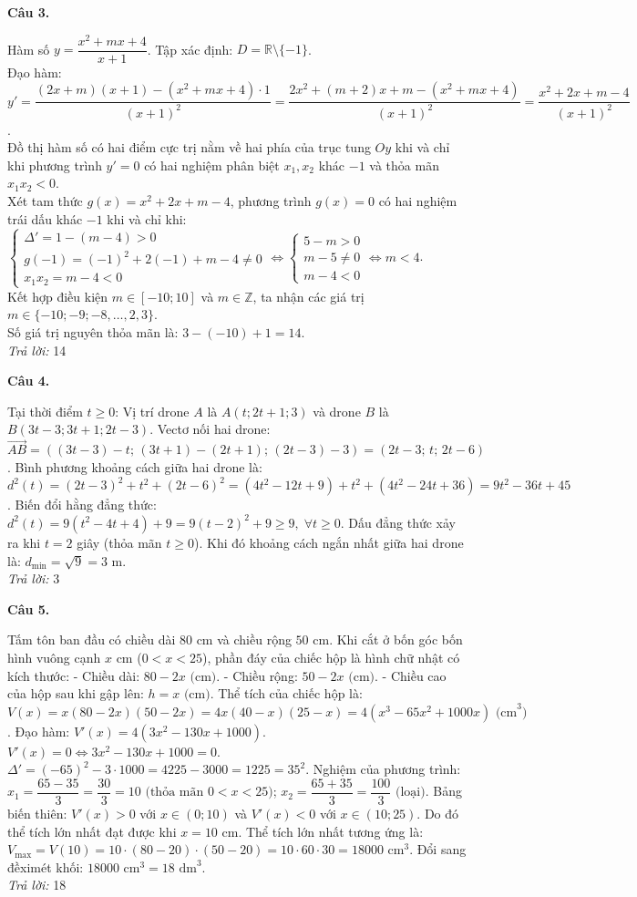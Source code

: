 \documentclass[12pt,a4paper]{article}
\newcommand{\loigiai}[1]{\par\medskip\Needspace{4\baselineskip}\noindent\textbf{#1}\par\nobreak}
\begin{document}
\loigiai{Câu 3.}
Hàm số $y=\dfrac{x^2+mx+4}{x+1}$. Tập xác định: $D=\mathbb{R}\setminus\{-1\}$.\\
Đạo hàm:
$y'=\dfrac{(2x+m)(x+1)-(x^2+mx+4)\cdot 1}{(x+1)^2}=\dfrac{2x^2+(m+2)x+m-(x^2+mx+4)}{(x+1)^2}=\dfrac{x^2+2x+m-4}{(x+1)^2}$.\\
Đồ thị hàm số có hai điểm cực trị nằm về hai phía của trục tung $Oy$ khi và chỉ khi phương trình $y'=0$ có hai nghiệm phân biệt $x_1, x_2$ khác $-1$ và thỏa mãn $x_1 x_2 < 0$.\\
Xét tam thức $g(x)=x^2+2x+m-4$, phương trình $g(x)=0$ có hai nghiệm trái dấu khác $-1$ khi và chỉ khi:
$\begin{cases}\Delta'=1-(m-4)>0\\g(-1)=(-1)^2+2(-1)+m-4\ne 0\\x_1 x_2 = m-4 < 0\end{cases}
\iff \begin{cases}5-m>0\\m-5\ne 0\\m-4<0\end{cases}\iff m<4$.\\
Kết hợp điều kiện $m\in[-10;10]$ và $m\in\mathbb{Z}$, ta nhận các giá trị $m\in\{-10;-9;-8,\dots,2,3\}$.\\
Số giá trị nguyên thỏa mãn là: $3-(-10)+1=14$.\\
\textit{Trả lời:} 14

\loigiai{Câu 4.}
Tại thời điểm $t\ge 0$:
Vị trí drone $A$ là $A(t;2t+1;3)$ và drone $B$ là $B(3t-3;3t+1;2t-3)$.
Vectơ nối hai drone:
$\vec{AB} = ((3t-3)-t;\,(3t+1)-(2t+1);\,(2t-3)-3) = (2t-3;\,t;\,2t-6)$.
Bình phương khoảng cách giữa hai drone là:
$d^2(t) = (2t-3)^2 + t^2 + (2t-6)^2 = (4t^2-12t+9) + t^2 + (4t^2-24t+36) = 9t^2-36t+45$.
Biến đổi hằng đẳng thức:
$d^2(t) = 9(t^2-4t+4) + 9 = 9(t-2)^2 + 9 \ge 9,\;\forall t\ge 0$.
Dấu đẳng thức xảy ra khi $t=2$ giây (thỏa mãn $t\ge 0$).
Khi đó khoảng cách ngắn nhất giữa hai drone là:
$d_{\min} = \sqrt{9} = 3\text{ m}$.\\
\textit{Trả lời:} 3

\loigiai{Câu 5.}
Tấm tôn ban đầu có chiều dài $80\text{ cm}$ và chiều rộng $50\text{ cm}$.
Khi cắt ở bốn góc bốn hình vuông cạnh $x\text{ cm}$ ($0 < x < 25$), phần đáy của chiếc hộp là hình chữ nhật có kích thước:
- Chiều dài: $80-2x\text{ (cm)}$.
- Chiều rộng: $50-2x\text{ (cm)}$.
- Chiều cao của hộp sau khi gập lên: $h = x\text{ (cm)}$.
Thể tích của chiếc hộp là:
$V(x) = x(80-2x)(50-2x) = 4x(40-x)(25-x) = 4(x^3-65x^2+1000x)\text{ (cm}^3\text{)}$.
Đạo hàm:
$V'(x) = 4(3x^2-130x+1000)$.
$V'(x) = 0 \iff 3x^2-130x+1000=0$.
$\Delta' = (-65)^2 - 3\cdot 1000 = 4225 - 3000 = 1225 = 35^2$.
Nghiệm của phương trình:
$x_1 = \dfrac{65-35}{3} = \dfrac{30}{3} = 10\text{ (thỏa mãn } 0 < x < 25\text{)}$;
$x_2 = \dfrac{65+35}{3} = \dfrac{100}{3}\text{ (loại)}$.
Bảng biến thiên: $V'(x)>0$ với $x\in(0;10)$ và $V'(x)<0$ với $x\in(10;25)$.
Do đó thể tích lớn nhất đạt được khi $x=10\text{ cm}$.
Thể tích lớn nhất tương ứng là:
$V_{\max} = V(10) = 10\cdot(80-20)\cdot(50-20) = 10\cdot 60\cdot 30 = 18000\text{ cm}^3$.
Đổi sang đềximét khối:
$18000\text{ cm}^3 = 18\text{ dm}^3$.\\
\textit{Trả lời:} 18
\end{document}
